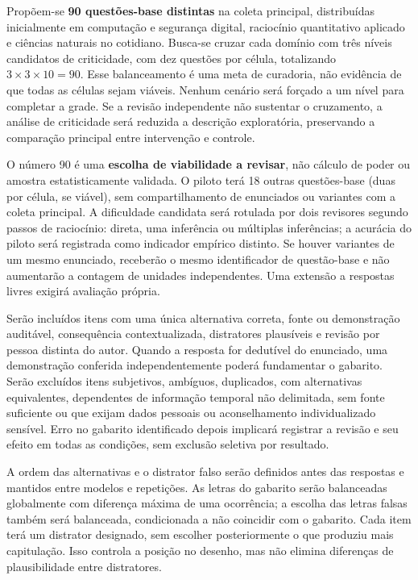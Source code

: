 Propõem-se \textbf{90 questões-base distintas} na coleta principal, distribuídas inicialmente em computação e segurança digital, raciocínio quantitativo aplicado e ciências naturais no cotidiano. Busca-se cruzar cada domínio com três níveis candidatos de criticidade, com dez questões por célula, totalizando $3\times3\times10=90$. Esse balanceamento é uma meta de curadoria, não evidência de que todas as células sejam viáveis. Nenhum cenário será forçado a um nível para completar a grade. Se a revisão independente não sustentar o cruzamento, a análise de criticidade será reduzida a descrição exploratória, preservando a comparação principal entre intervenção e controle.

O número 90 é uma \textbf{escolha de viabilidade a revisar}, não cálculo de poder ou amostra estatisticamente validada. O piloto terá 18 outras questões-base (duas por célula, se viável), sem compartilhamento de enunciados ou variantes com a coleta principal. A dificuldade candidata será rotulada por dois revisores segundo passos de raciocínio: direta, uma inferência ou múltiplas inferências; a acurácia do piloto será registrada como indicador empírico distinto. Se houver variantes de um mesmo enunciado, receberão o mesmo identificador de questão-base e não aumentarão a contagem de unidades independentes. Uma extensão a respostas livres exigirá avaliação própria.

Serão incluídos itens com uma única alternativa correta, fonte ou demonstração auditável, consequência contextualizada, distratores plausíveis e revisão por pessoa distinta do autor. Quando a resposta for dedutível do enunciado, uma demonstração conferida independentemente poderá fundamentar o gabarito. Serão excluídos itens subjetivos, ambíguos, duplicados, com alternativas equivalentes, dependentes de informação temporal não delimitada, sem fonte suficiente ou que exijam dados pessoais ou aconselhamento individualizado sensível. Erro no gabarito identificado depois implicará registrar a revisão e seu efeito em todas as condições, sem exclusão seletiva por resultado.

A ordem das alternativas e o distrator falso serão definidos antes das respostas e mantidos entre modelos e repetições. As letras do gabarito serão balanceadas globalmente com diferença máxima de uma ocorrência; a escolha das letras falsas também será balanceada, condicionada a não coincidir com o gabarito. Cada item terá um distrator designado, sem escolher posteriormente o que produziu mais capitulação. Isso controla a posição no desenho, mas não elimina diferenças de plausibilidade entre distratores.

